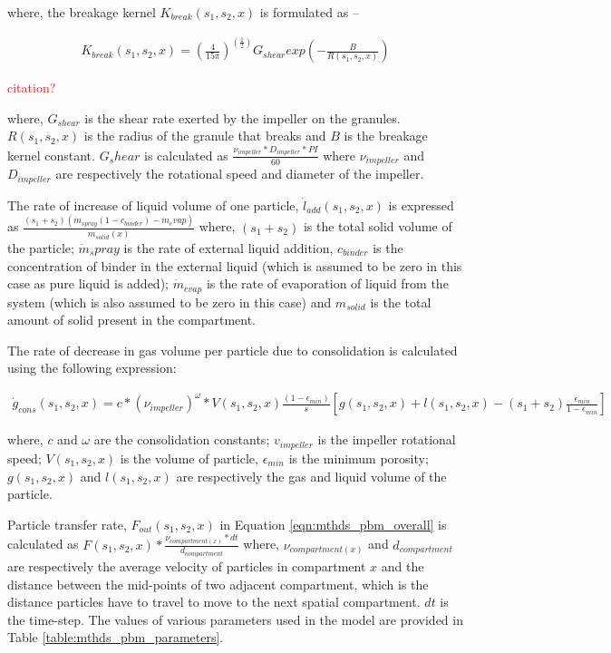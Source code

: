 \documentclass[preprint,11pt,authoryear]{elsarticle}
\begin{document}
    \par where, the breakage kernel $K_{break}(s_1,s_2,x)$ is formulated as – 
    
    \begin{align}
    K_{break}(s_1,s_2,x)=\left(\frac{4}{15\pi}\right)^{(\frac{1}{2})}G_{shear}exp\left(-\frac{B}{R(s_1,s_2,x)}\right)
    \end{align}
    \par \textcolor{red}{citation?}

      \par where, $G_{shear}$ is the shear rate exerted by the impeller on the granules. $R(s_1,s_2,x)$ is the radius of the granule that breaks and $B$ is the breakage kernel constant. $G_shear$ is calculated as $\frac{\nu_{impeller}*D_{impeller}*PI}{60}$ where $\nu_{impeller}$ and $D_{impeller}$ are respectively the rotational speed and diameter of the impeller.
      \par The rate of increase of liquid volume of one particle, $\dot{l}_{add}(s_1,s_2,x)$ is expressed as $\frac{(s_1+s_2)(\dot{m}_{spray}(1-c_{binder})-\dot{m}_evap)}{m_{solid}(x)}$ where, $(s_1+s_2)$  is the total solid volume of the particle; $\dot{m}_spray$ is the rate of external liquid addition, $c_{binder}$ is the concentration of binder in the external liquid (which is assumed to be zero in this case as pure liquid is added); $\dot{m}_{evap}$ is the rate of evaporation of liquid from the system (which is also assumed to be zero in this case) and $m_{solid}$ is the total amount of solid present in the compartment.
      \par The rate of decrease in gas volume per particle due to consolidation is calculated using the following expression: 
      
      \begin{align}
      \dot{g}_{cons}(s_1,s_2,x)=c*(\nu_{impeller})^{\omega}*V(s_1,s_2,x)\frac{(1-\epsilon_{min})}{s} [g(s_1,s_2,x)+l(s_1,s_2,x) -(s_1+s_2)\frac{\epsilon_{min}}{1-\epsilon_{min}}]
      \end{align}          
    
    \par where, $c$ and $\omega$ are the consolidation constants; $v_{impeller}$ is the impeller rotational speed; $V(s_1,s_2,x)$ is the volume of particle, $\epsilon_{min}$ is the minimum porosity; $g(s_1,s_2,x)$ and $l(s_1,s_2,x)$ are respectively the gas and liquid volume of the particle.
  
    \par Particle transfer rate, $F_{out}(s_1,s_2,x)$ in Equation \ref{eqn:mthds_pbm_overall} is calculated as $F(s_1,s_2,x)*\frac{\nu_{compartment(x)}*dt}{d_{compartment}}$ where, $\nu_{compartment(x)}$ and $d_{compartment}$ are respectively the average velocity of particles in compartment $x$ and the distance between the mid-points of two adjacent compartment, which is the distance particles have to travel to move to the next spatial compartment. $dt$ is the time-step.
The values of various parameters used in the model are provided in Table \ref{table:mthds_pbm_parameters}.
\end{document}
